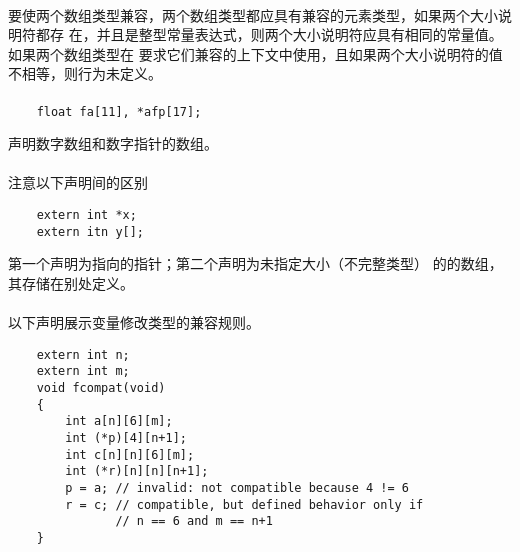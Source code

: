 {\paragraph{}
要使两个数组类型兼容，两个数组类型都应具有兼容的元素类型，如果两个大小说明符都存
在，并且是整型常量表达式，则两个大小说明符应具有相同的常量值。如果两个数组类型在
要求它们兼容的上下文中使用，且如果两个大小说明符的值不相等，则行为未定义。

\paragraph{}
\ex
\begin{lstlisting}
    float fa[11], *afp[17];
\end{lstlisting}
声明数字数组和数字指针的数组。

\paragraph{}
\ex 注意以下声明间的区别
\begin{lstlisting}
    extern int *x;
    extern itn y[];
\end{lstlisting}
第一个声明为指向的指针；第二个声明为未指定大小（不完整类型）
的的数组，其存储在别处定义。

\paragraph{}
\ex 以下声明展示变量修改类型的兼容规则。
\begin{lstlisting}
    extern int n;
    extern int m;
    void fcompat(void)
    {
        int a[n][6][m];
        int (*p)[4][n+1];
        int c[n][n][6][m];
        int (*r)[n][n][n+1];
        p = a; // invalid: not compatible because 4 != 6
        r = c; // compatible, but defined behavior only if
               // n == 6 and m == n+1
    }
\end{lstlisting}

}
